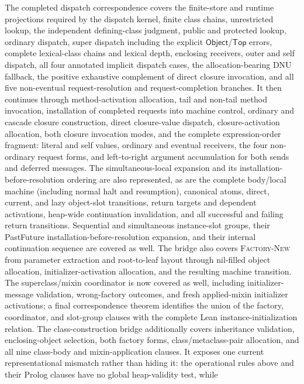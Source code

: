 \documentclass[11pt]{article}
\numberwithin{equation}{section}
\newcommand{\kw}[1]{\ensuremath{\mathsf{#1}}}
\newcommand{\Top}{\kw{Top}}
\newcommand{\Object}{\kw{Object}}
\newcommand{\rulelabel}[1]{\textsc{#1}}
\begin{document}
The completed dispatch correspondence covers the finite-store and runtime
projections required by the dispatch kernel, finite class chains,
unrestricted lookup, the independent defining-class judgment, public and
protected lookup, ordinary dispatch, super dispatch including the explicit
\Object{}/\Top{} errors, complete lexical-class chains and lexical depth,
enclosing receivers, outer and self dispatch, all four annotated implicit
dispatch cases, the allocation-bearing DNU fallback, the positive exhaustive
complement of direct closure invocation, and all five non-eventual
request-resolution and request-completion branches.  It then continues
through method-activation allocation, tail and non-tail method invocation,
installation of completed requests into machine control, ordinary and cascade
closure construction, direct closure-value dispatch, closure-activation
allocation, both closure invocation modes, and the complete expression-order
fragment: literal and self values, ordinary and eventual receivers, the four
non-ordinary request forms, and left-to-right argument accumulation for both
sends and deferred messages.  The simultaneous-local expansion and its
installation-before-resolution ordering are also represented, as are the
complete body/local machine (including normal halt and resumption), canonical
atoms, direct, current, and lazy object-slot transitions, return targets and
dependent activations, heap-wide continuation invalidation, and all successful
and failing return transitions.  Sequential and simultaneous instance-slot
groups, their PastFuture installation-before-resolution expansion, and their
internal continuation sequence are covered as well.  The bridge also covers
\rulelabel{Factory-New} from parameter extraction and root-to-leaf layout
through nil-filled object allocation, initializer-activation allocation, and
the resulting machine transition.  The superclass/mixin coordinator is now
covered as well, including initializer-message validation, wrong-factory
outcomes, and fresh applied-mixin initializer activations; a final
correspondence theorem identifies the union of the factory, coordinator, and
slot-group clauses with the complete Lean instance-initialization relation.
The class-construction bridge additionally covers inheritance validation,
enclosing-object selection, both factory forms, class/metaclass-pair
allocation, and all nine class-body and mixin-application clauses.  It exposes
one current representational mismatch rather than hiding it: the operational
rules above and their Prolog clauses have no global heap-validity test, while
\end{document}
